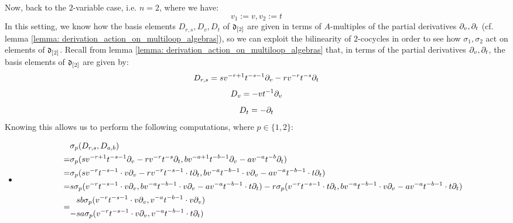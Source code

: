 \begin{example}
            Now, back to the $2$-variable case, i.e. $n = 2$, where we have:
                $$v_1 := v, v_2 := t$$
            In this setting, we know how the basis elements $D_{r, s}, D_v, D_t$ of $\d_{[2]}$ are given in terms of $A$-multiples of the partial derivatives $\del_v, \del_t$ (cf. lemma \ref{lemma: derivation_action_on_multiloop_algebras}), so we can exploit the bilinearity of $2$-cocycles in order to see how $\sigma_1, \sigma_2$ act on elements of $\d_{[2]}$. Recall from lemma \ref{lemma: derivation_action_on_multiloop_algebras} that, in terms of the partial derivatives $\del_v, \del_t$, the basis elements of $\d_{[2]}$ are given by:
                $$D_{r, s} = s v^{-r + 1} t^{-s - 1} \del_v - r v^{-r} t^{-s} \del_t$$
                $$D_v = -v t^{-1} \del_v$$
                $$D_t = -\del_t$$
            Knowing this allows us to perform the following computations, where $p \in \{1, 2\}$:
            \begin{itemize}
                \item 
                    $$
                        \begin{aligned}
                            & \sigma_p(D_{r, s}, D_{a, b})
                            \\
                            = & \sigma_p( s v^{-r + 1} t^{-s - 1} \del_v - r v^{-r} t^{-s} \del_t, b v^{-a + 1} t^{-b - 1} \del_v - a v^{-a} t^{-b} \del_t )
                            \\
                            = & \sigma_p( s v^{-r} t^{-s - 1} \cdot v\del_v - r v^{-r} t^{-s - 1} \cdot t \del_t, b v^{-a} t^{-b - 1} \cdot v\del_v - a v^{-a} t^{-b - 1} \cdot t \del_t )
                            \\
                            = & s \sigma_p( v^{-r} t^{-s - 1} \cdot v\del_v, b v^{-a} t^{-b - 1} \cdot v\del_v - a v^{-a} t^{-b - 1} \cdot t \del_t ) - r \sigma_p( v^{-r} t^{-s - 1} \cdot t \del_t, b v^{-a} t^{-b - 1} \cdot v\del_v - a v^{-a} t^{-b - 1} \cdot t \del_t )
                            \\
                            = &
                            \begin{aligned}
                                & s b \sigma_p( v^{-r} t^{-s - 1} \cdot v\del_v, v^{-a} t^{-b - 1} \cdot v\del_v )
                                \\
                                - & s a \sigma_p( v^{-r} t^{-s - 1} \cdot v\del_v, v^{-a} t^{-b - 1} \cdot t \del_t )

\end{aligned}
\end{aligned}$$
\end{itemize}
\end{example}
